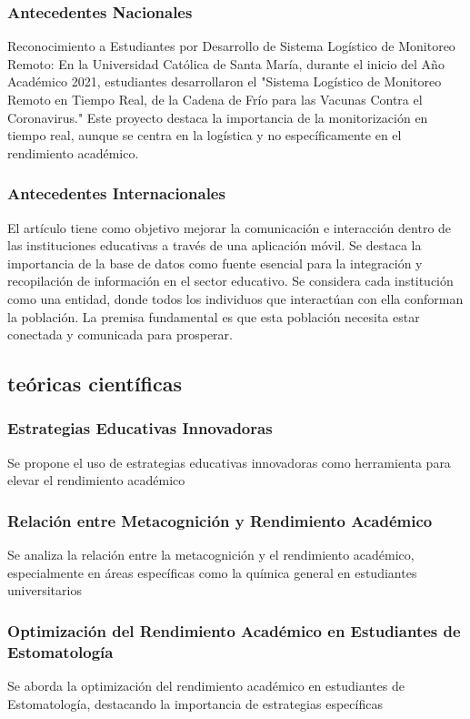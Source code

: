 \documentclass[12pt]{article}
\begin{document}
\subsubsection*{Antecedentes Nacionales}
Reconocimiento a Estudiantes por Desarrollo de Sistema Logístico de Monitoreo Remoto:
En la Universidad Católica de Santa María, durante el inicio del Año Académico 2021, estudiantes desarrollaron el "Sistema Logístico de Monitoreo Remoto en Tiempo Real, de la Cadena de Frío para las Vacunas Contra el Coronavirus." Este proyecto destaca la importancia de la monitorización en tiempo real, aunque se centra en la logística y no específicamente en el rendimiento académico.
 
\subsubsection*{Antecedentes Internacionales}
El artículo tiene como objetivo mejorar la comunicación e interacción dentro de las instituciones educativas a través de una aplicación móvil. Se destaca la importancia de la base de datos como fuente esencial para la integración y recopilación de información en el sector educativo. Se considera cada institución como una entidad, donde todos los individuos que interactúan con ella conforman la población. La premisa fundamental es que esta población necesita estar conectada y comunicada para prosperar.

\subsection{teóricas científicas }%
\subsubsection*{Estrategias Educativas Innovadoras} Se propone el uso de estrategias educativas innovadoras como herramienta para elevar el rendimiento académico %

\subsubsection*{Relación entre Metacognición y Rendimiento Académico} Se analiza la relación entre la metacognición y el rendimiento académico, especialmente en áreas específicas como la química general en estudiantes universitarios %

\subsubsection*{Optimización del Rendimiento Académico en Estudiantes de Estomatología} Se aborda la optimización del rendimiento académico en estudiantes de Estomatología, destacando la importancia de estrategias específicas %
\end{document}
